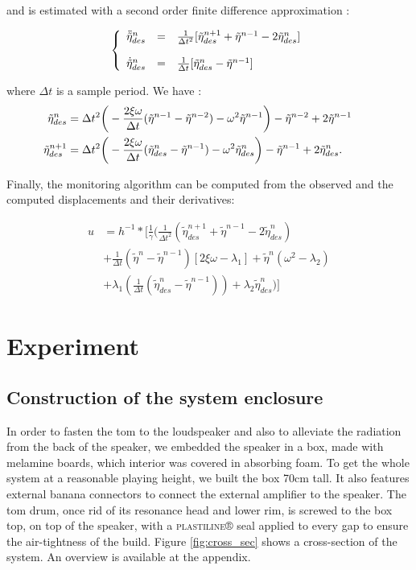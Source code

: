 \documentclass[11pt, twocolumn]{article}
\begin{document}
and is estimated with a second order finite difference approximation :

\[
\left\{
\begin{array}{r c l}
\Ddot{\tilde{\eta}}_{des}^n &=& \frac{1}{\Delta t^2} [\tilde{\eta}_{des}^{n+1} + \tilde{\eta}^{n-1} - 2 \tilde{\eta}_{des}^n ]\\
\\
\dot{\tilde{\eta}}_{des}^n &=& \frac{1}{\Delta t} [\tilde{\eta}_{des}^n - \tilde{\eta}^{n-1}]\\
\end{array}
\right.
\]

where $\Delta t$ is a sample period. We have :
{\small
\begin{align}
    \hspace{-20pt}\tilde{\eta}_{des}^n &= \Delta t^2 \bigg(- \frac{2\xi\omega}{\Delta t} (\tilde{\eta}^{n-1} - \tilde{\eta}^{n-2}) - \omega^2 \tilde{\eta}^{n-1} \bigg) - \tilde{\eta}^{n-2} + 2\tilde{\eta}^{n-1} \nonumber\\
    \hspace{-20pt}\tilde{\eta}_{des}^{n+1} &= \Delta t^2 \bigg(- \frac{2\xi\omega}{\Delta t} (\tilde{\eta}_{des}^{n} - \tilde{\eta}^{n-1}) - \omega^2 \tilde{\eta}_{des}^{n} \bigg) - \tilde{\eta}^{n-1} + 2\tilde{\eta}_{des}^{n}. 
\end{align}
}

Finally, the monitoring algorithm can be computed from the observed and the computed displacements and their derivatives: 

\begin{align}
    u &= h^{-1} * \Bigg[\frac{1}{\gamma} \bigg( \frac{1}{\Delta t^2}(\tilde{\eta}_{des}^{n+1} + \tilde{\eta}^{n-1} - 2 \tilde{\eta}_{des}^n) \nonumber \\
    &+  \frac{1}{\Delta t} (\tilde{\eta}^n - \tilde{\eta}^{n-1})[2\xi\omega - \lambda_1] + \tilde{\eta}^n(\omega^2 - \lambda_2) \nonumber \\
    &+ \lambda_1 (\frac{1}{\Delta t} (\tilde{\eta}_{des}^n - \tilde{\eta}^{n-1})) + \lambda_2 \tilde{\eta}_{des}^n \bigg)\Bigg]
\end{align}

\section{Experiment}
\subsection{Construction of the system enclosure}
In order to fasten the tom to the loudspeaker and also to alleviate the radiation from the back of the speaker, we embedded the speaker in a box, made with melamine boards, which interior was covered in absorbing foam. To get the whole system at a reasonable playing height, we built the box 70cm tall. It also features external banana connectors to connect the external amplifier to the speaker. The tom drum, once rid of its resonance head and lower rim, is screwed to the box top, on top of the speaker, with a \textsc{plastiline®} seal applied to every gap to ensure the air-tightness of the build. Figure \ref{fig:cross_sec} shows a cross-section of the system. An overview is available at the appendix.
\end{document}
